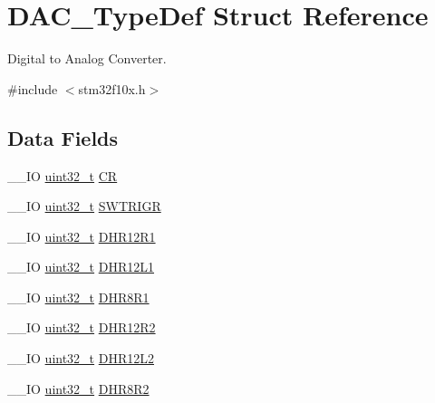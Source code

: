 \hypertarget{struct_d_a_c___type_def}{\section{D\-A\-C\-\_\-\-Type\-Def Struct Reference}
\label{struct_d_a_c___type_def}
}


Digital to Analog Converter.  




{\ttfamily \#include $<$stm32f10x.\-h$>$}

\subsection*{Data Fields}
\begin{DoxyCompactItemize}
\item 
\-\_\-\-\_\-\-I\-O \hyperlink{stdint_8h_a435d1572bf3f880d55459d9805097f62}{uint32\-\_\-t} \hyperlink{struct_d_a_c___type_def_a394324f0b573837ca15a87127b2a37ea}{C\-R}
\item 
\-\_\-\-\_\-\-I\-O \hyperlink{stdint_8h_a435d1572bf3f880d55459d9805097f62}{uint32\-\_\-t} \hyperlink{struct_d_a_c___type_def_a4ccb66068a1ebee1179574dda20206b6}{S\-W\-T\-R\-I\-G\-R}
\item 
\-\_\-\-\_\-\-I\-O \hyperlink{stdint_8h_a435d1572bf3f880d55459d9805097f62}{uint32\-\_\-t} \hyperlink{struct_d_a_c___type_def_afbfd2855cdb81939b4efc58e08aaf3e5}{D\-H\-R12\-R1}
\item 
\-\_\-\-\_\-\-I\-O \hyperlink{stdint_8h_a435d1572bf3f880d55459d9805097f62}{uint32\-\_\-t} \hyperlink{struct_d_a_c___type_def_a5eb63912e39085e3e13d64bdb0cf38bd}{D\-H\-R12\-L1}
\item 
\-\_\-\-\_\-\-I\-O \hyperlink{stdint_8h_a435d1572bf3f880d55459d9805097f62}{uint32\-\_\-t} \hyperlink{struct_d_a_c___type_def_a3a382d341fb608a04390bacb8c00b0f0}{D\-H\-R8\-R1}
\item 
\-\_\-\-\_\-\-I\-O \hyperlink{stdint_8h_a435d1572bf3f880d55459d9805097f62}{uint32\-\_\-t} \hyperlink{struct_d_a_c___type_def_ab1f777540c487c26bf27e6fa37a644cc}{D\-H\-R12\-R2}
\item 
\-\_\-\-\_\-\-I\-O \hyperlink{stdint_8h_a435d1572bf3f880d55459d9805097f62}{uint32\-\_\-t} \hyperlink{struct_d_a_c___type_def_a9f612b6b3e065e810e5a2fb254d6a40b}{D\-H\-R12\-L2}
\item 
\-\_\-\-\_\-\-I\-O \hyperlink{stdint_8h_a435d1572bf3f880d55459d9805097f62}{uint32\-\_\-t} \hyperlink{struct_d_a_c___type_def_a3b096b71656f8fb32cd18b4c8b1d2334}{D\-H\-R8\-R2}

\end{DoxyCompactItemize}
